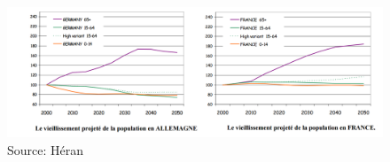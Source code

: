 \begin{figure}[h!]
    \begin{center}
        \includegraphics[scale=0.4]{document/vieillissement.png}
        \caption{Source: Héran~\citep[pp.5-6]{heran}}
        \label{vieillissement}
    \end{center}
\end{figure}


